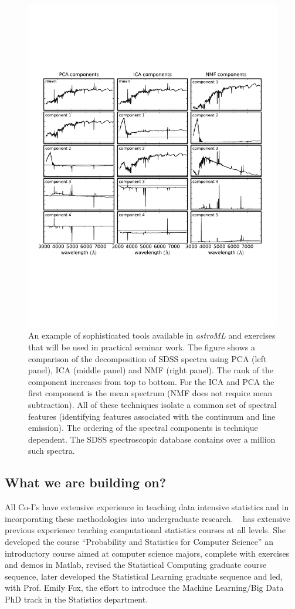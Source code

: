 \begin{figure}[!t]
\vskip -1.9in
\phantom{x} \hskip 0.7in 
\includegraphics[width=0.8\hsize,clip]{astroML2.pdf}
\vskip -1.6in
\caption{An example of sophisticated tools available in {\it astroML} and exercises that will be
used in practical seminar work. The figure shows a comparison of the decomposition of SDSS 
spectra using PCA (left panel), ICA (middle panel) and NMF (right panel). The rank of the component
increases from top to bottom. For the ICA and PCA the first component is the mean spectrum (NMF 
does not require mean subtraction). All of these techniques isolate a common set of spectral features 
(identifying features associated with the continuum and line emission). The ordering of the spectral 
components is technique dependent. The SDSS spectroscopic database contains over a million
such spectra.} 
\label{Fig:astroML2}
\end{figure}


\subsection{What we are building on?}
\label{sec:precursors}

All Co-I's have extensive experience in teaching data intensive
statistics and in incorporating these methodologies into undergraduate
research. \meila~ has extensive previous experience teaching
computational statistics courses at all levels. She developed the
course ``Probability and Statistics for Computer Science'' an
introductory course aimed at computer science majors, complete with
exercises and demos in Matlab, revised the Statistical Computing
graduate course sequence, later developed the Statistical Learning
graduate sequence and led, with Prof. Emily Fox, the effort to
introduce the Machine Learning/Big Data PhD track in the Statistics
department.

